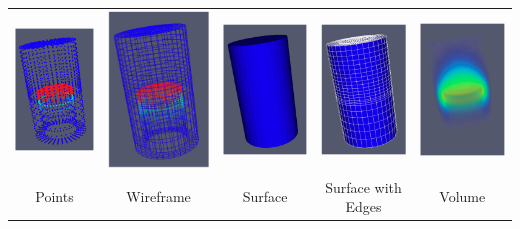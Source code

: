 \begin{inlinefig}
  \begin{tabular}{c@{\;}c@{\;}c@{\;}c@{\;}c}
    \includegraphics[width=.18\linewidth]{images/RepresentationPoints} &
    \includegraphics[width=.18\linewidth]{images/RepresentationWireframe} &
    \includegraphics[width=.18\linewidth]{images/RepresentationSurface} &
    \includegraphics[width=.18\linewidth]{images/RepresentationSurfaceEdges} &
    \includegraphics[width=.18\linewidth]{images/RepresentationVolume}
    \\
    Points &
    Wireframe &
    Surface &
    \parbox[t]{.18\linewidth}{\centering{}Surface with Edges} &
    Volume
  \end{tabular}
\end{inlinefig}

